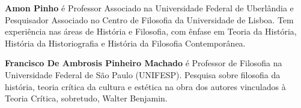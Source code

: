 \textbf{Amon Pinho} é Professor Associado na Universidade Federal de Uberlândia e Pesquisador Associado no Centro de Filosofia da Universidade de Lisboa. Tem experiência nas áreas de História e Filosofia, com ênfase em Teoria da História, História da Historiografia e História da Filosofia Contemporânea.

\textbf{Francisco De Ambrosis Pinheiro Machado} é Professor de Filosofia na Universidade Federal de São Paulo (UNIFESP). Pesquisa sobre filosofia da história, teoria crítica da cultura e estética na obra dos autores vinculados à Teoria Crítica, sobretudo, Walter Benjamin.



